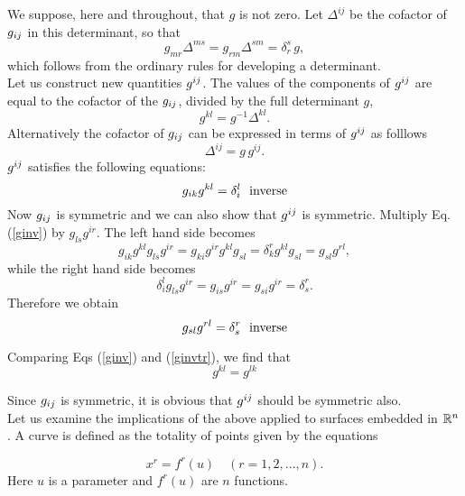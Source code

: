 We suppose, here and throughout, that $g$ is not zero. Let $\Delta^{ij}$ be the cofactor of $g_{ij}$ in this determinant, so that 
$$g_{mr} \Delta^{ms} = g_{rm}\Delta^{sm} = \delta^s_r\, g,$$ which follows from the ordinary rules for developing a determinant. \\
 
Let us construct new quantities $g^{ij}$. 
The values of the components of $g^{ij}$ are equal to the cofactor of the $g_{ij}$, divided by the full determinant $g$,
\begin{equation} g^{kl} = g^{-1} \Delta^{kl}.  \label{ginveq} \end{equation} Alternatively the cofactor of $g_{ij}$ can be expressed in terms of $g^{ij}$ as folllows
\begin{equation} \Delta^{ij} = g\,g^{ij}\label{cofactor}. \end{equation}
$g^{ij}$ satisfies the following equations:
\begin{equation}
g_{ik}g^{kl}  = \delta^l_i \label{ginv}\hbox{~~inverse}
\end{equation}
Now $g_{ij}$ is symmetric and we can also show that $g^{ij}$ is symmetric. Multiply Eq. (\ref{ginv}) by $g_{ls}g^{ir}$. The left hand side becomes
\[ g_{ik}g^{kl} g_{ls}g^{ir} =g_{ki}g^{ir} g^{kl}g_{sl} = \delta^r_k g^{kl} g_{sl} = g_{sl}g^{rl}, \] while the right hand side becomes
\[ \delta^l_i g_{ls}g^{ir} = g_{is}g^{ir} = g_{si}g^{ir} = \delta^r_s.\] Therefore we obtain 
\begin{equation}
g_{sl}g^{rl} = \delta^r_s \hbox{~~inverse}\label{ginvtr}
\end{equation}

Comparing Eqs (\ref{ginv}) and (\ref{ginvtr}), we find that
\[ g^{kl} = g^{lk} \]

Since $g_{ij}$ is symmetric, it is obvious that $g^{ij}$ should be symmetric also. \\

Let us examine the implications of the above applied to surfaces embedded in $\mathbb{R}^n$. 
A {\elevenit curve} is defined as the totality of points given by the equations

\begin{equation}
x^r = f^r(u)\quad (r = 1,2,...,n).\label{curve}
\end{equation}
Here $u$ is a parameter and $f^r(u)$ are $n$ functions.\\


